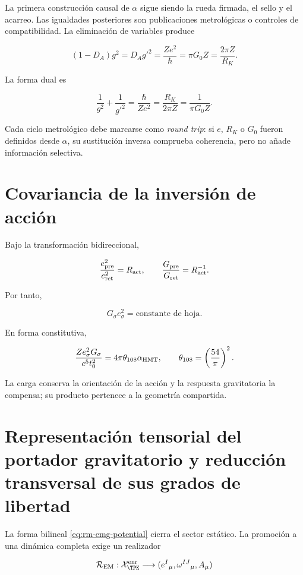 La primera construcci\'on causal de \(\alpha\) sigue siendo la rueda firmada,
el sello y el acarreo. Las igualdades posteriores son publicaciones
metrol\'ogicas o controles de compatibilidad. La eliminaci\'on de variables
produce

\[
(1-D_A)g^2=D_Ag'^2
=\frac{Ze^2}{\hbar}
=\pi G_0Z
=\frac{2\pi Z}{R_K}.
\]

La forma dual es

\[
\frac1{g^2}+\frac1{g'^2}
=\frac{\hbar}{Ze^2}
=\frac{R_K}{2\pi Z}
=\frac1{\pi G_0Z}.
\]

Cada ciclo metrol\'ogico debe marcarse como \emph{round trip}: si \(e\),
\(R_K\) o \(G_0\) fueron definidos desde \(\alpha\), su sustituci\'on inversa
comprueba coherencia, pero no a\~nade informaci\'on selectiva.

\section{Covariancia de la inversi\'on de acci\'on}

Bajo la transformaci\'on bidireccional,

\[
\frac{e_{\rm pre}^2}{e_{\rm ret}^2}=R_{\rm act},
\qquad
\frac{G_{\rm pre}}{G_{\rm ret}}=R_{\rm act}^{-1}.
\]

Por tanto,

\begin{equation}
\boxed{G_{\sigma}e_{\sigma}^2=\text{constante de hoja}.}
\label{eq:rm-ge2-invariant}
\end{equation}

En forma constitutiva,

\[
\frac{Ze_{\sigma}^2G_{\sigma}}
{c^5t_0^2}
=4\pi\theta_{108}\alpha_{\rm HMT},
\qquad
\theta_{108}=\left(\frac{54}{\pi}\right)^2.
\]

La carga conserva la orientaci\'on de la acci\'on y la respuesta gravitatoria
la compensa; su producto pertenece a la geometr\'ia compartida.

\section{Representación tensorial del portador gravitatorio y reducción transversal de sus grados de libertad}

La forma bilineal \eqref{eq:rm-emg-potential} cierra el sector est\'atico. La
promoci\'on a una din\'amica completa exige un realizador

\[
\mathcal R_{\rm EM}:
\mathcal X_{\TPK}^{\rm enr}
\longrightarrow
(e^I{}_{\mu},\omega^{IJ}{}_{\mu},A_\mu)
\]

